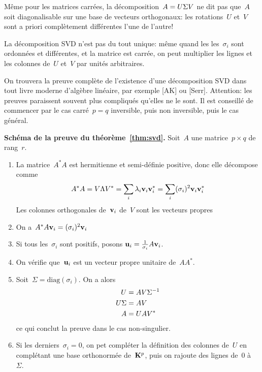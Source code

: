 \begin{remark}
	Même pour les matrices carrées, la décomposition~$A=U\/\Sigma V$ ne dit pas
	que~$A$ soit diagonalisable sur une base de vecteurs orthogonaux: les
	rotations~$U$ et~$V$ sont a priori complètement différentes l'une de l'autre!
\end{remark}

\begin{remark}
	La décomposition SVD n'est pas du tout unique: même quand les
	les~$\sigma_i$ sont ordonnées et différentes, et la matrice est carrée, on
	peut multiplier les lignes et les colonnes de~$U$ et~$V$ par unités
	arbitraires.
\end{remark}

On trouvera la preuve complète de l'existence d'une décomposition SVD dans
tout livre moderne d'algèbre linéaire, par exemple [AK] ou [Serr].
Attention: les preuves paraissent souvent plus compliqués qu'elles ne le
sont.  Il est conseillé de commencer par le cas carré~$p=q$ inversible, puis
non inversible, puis le cas général.

{\bf Schéma de la preuve du théorème~\ref{thm:svd}.}
Soit~$A$ une matrice~$p\times q$ de rang~$r$.
\begin{enumerate}
	\item La matrice~$A^*A$ est hermitienne et semi-définie positive, donc elle
		décompose comme
		\[
		A^*A=V\Lambda V^*
		=\sum_i\lambda_i\mathbf{v}_i\mathbf{v}_i^*
		=\sum_i(\sigma_i)^2\mathbf{v}_i\mathbf{v}_i^*
		\]
	Les colonnes orthogonales de~$\mathbf{v}_i$ de~$V$ sont les vecteurs propres
	\item On a~$A^*A\mathbf{v}_i=(\sigma_i)^2\mathbf{v}_i$
	\item Si tous les~$\sigma_i$ sont positifs, posons
		$\mathbf{u}_i=\tfrac1{\sigma_i}A\mathbf{v}_i$.
	\item On vérifie que~$\mathbf{u}_i$ est un vecteur propre unitaire de~$AA^*$.
	\item Soit~$\Sigma=\mathrm{diag}(\sigma_i)$.  On a alors
		\begin{align*}
			U & =A V\Sigma^{-1} \\
			U\/\Sigma & =A V \\
			A & =U\/A V^* \\
		\end{align*}
		ce qui conclut la preuve dans le cas non-singulier.
	\item Si les derniers~$\sigma_i=0$, on pet compléter la définition des
		colonnes de~$U$ en complétant une base orthonormée de~$\mathbf{K}^p$, puis on
		rajoute des lignes de~$0$ à~$\Sigma$.
\end{enumerate}

